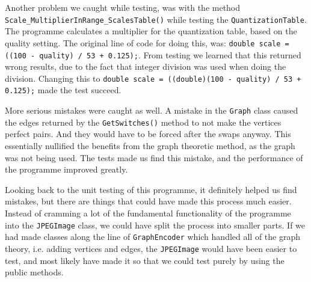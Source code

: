 Another problem we caught while testing, was with the method \lstinline|Scale_MultiplierInRange_ScalesTable()| while testing the \lstinline|QuantizationTable|.
The programme calculates a multiplier for the quantization table, based on the quality setting.
The original line of code for doing this, was: \lstinline|double scale = ((100 - quality) / 53 + 0.125);|.
From testing we learned that this returned wrong results, due to the fact that integer division was used when doing the division.
Changing this to \lstinline|double scale = ((double)(100 - quality) / 53 + 0.125);| made the test succeed.

More serious mistakes were caught as well.
A mistake in the \lstinline|Graph| class caused the edges returned by the \lstinline|GetSwitches()| method to not make the vertices perfect pairs.
And they would have to be forced after the swaps anyway.
This essentially nullified the benefits from the graph theoretic method, as the graph was not being used.
The tests made us find this mistake, and the performance of the programme improved greatly.

Looking back to the unit testing of this programme, it definitely helped us find mistakes, but there are things that could have made this process much easier.
Instead of cramming a lot of the fundamental functionality of the programme into the \lstinline|JPEGImage| class, we could have split the process into smaller parts.
If we had made classes along the line of \lstinline|GraphEncoder| which handled all of the graph theory, i.e. adding vertices and edges, the \lstinline|JPEGImage| would have been easier to test, and most likely have made it so that we could test purely by using the public methods. 